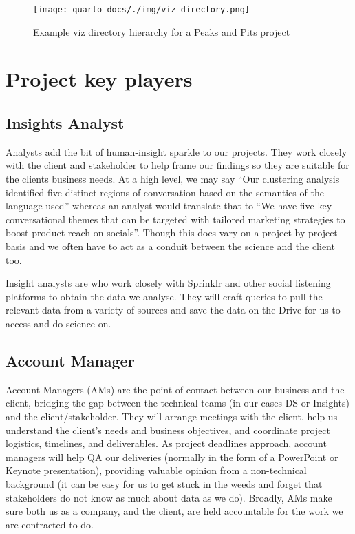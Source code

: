 \documentclass[
  letterpaper,
  DIV=11,
  numbers=noendperiod]{scrreprt}
\begin{document}
\begin{figure}[H]

{\centering \texttt{[image: quarto\_docs/./img/viz\_directory.png]}

}

\caption{Example viz directory hierarchy for a Peaks and Pits project}

\end{figure}%

\chapter{Project key players}\label{project-key-players}

\section{Insights Analyst}\label{insights-analyst}

Analysts add the bit of human-insight sparkle to our projects. They work
closely with the client and stakeholder to help frame our findings so
they are suitable for the clients business needs. At a high level, we
may say ``Our clustering analysis identified five distinct regions of
conversation based on the semantics of the language used'' whereas an
analyst would translate that to ``We have five key conversational themes
that can be targeted with tailored marketing strategies to boost product
reach on socials''. Though this does vary on a project by project basis
and we often have to act as a conduit between the science and the client
too.

Insight analysts are who work closely with Sprinklr and other social
listening platforms to obtain the data we analyse. They will craft
queries to pull the relevant data from a variety of sources and save the
data on the Drive for us to access and do science on.

\section{Account Manager}\label{account-manager}

Account Managers (AMs) are the point of contact between our business and
the client, bridging the gap between the technical teams (in our cases
DS or Insights) and the client/stakeholder. They will arrange meetings
with the client, help us understand the client's needs and business
objectives, and coordinate project logistics, timelines, and
deliverables. As project deadlines approach, account managers will help
QA our deliveries (normally in the form of a PowerPoint or Keynote
presentation), providing valuable opinion from a non-technical
background (it can be easy for us to get stuck in the weeds and forget
that stakeholders do not know as much about data as we do). Broadly, AMs
make sure both us as a company, and the client, are held accountable for
the work we are contracted to do.
\end{document}
